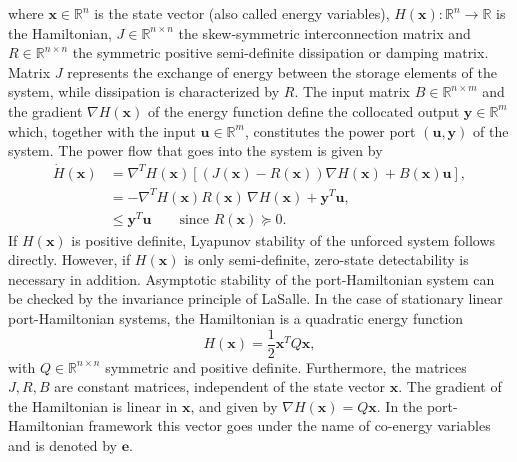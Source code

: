 \documentclass[preprint,12pt]{elsarticle}
\begin{document}
where $\bm{x} \in \mathbb{R}^{n}$ is the state vector (also called  energy variables), $ H(\bm{x}) : \mathbb{R}^{n} \rightarrow \mathbb{R} $ is the Hamiltonian, $J \in \mathbb{R}^{n \times n}$ the skew-symmetric interconnection matrix and $R \in \mathbb{R}^{n \times n}$ the symmetric positive semi-definite dissipation or damping matrix.  Matrix $J$ represents the exchange of energy between the storage elements of the system, while dissipation is characterized by $R$. The
input matrix $B \in \mathbb{R}^{n \times m}$ and the gradient $\nabla H(\bm{x})$ of the energy function define the collocated output $\bm{y} \in \mathbb{R}^{m}$ which, together with the input $\bm{u} \in \mathbb{R}^{m}$, constitutes the power port $(\bm{u}, \bm{y})$ of the system. The power flow that goes into the system is given by
\begin{equation}
\begin{aligned}
\dot{H}(\bm{x}) &= \nabla^T{H(\bm{x})} [(J(\bm{x}) - R(\bm{x})) \nabla H(\bm{x}) + B(\bm{x})\bm{u} ], \\ 
&= - \nabla^T{H(\bm{x})} R(\bm{x}) \, \nabla{H(\bm{x})} + \bm{y}^T \bm{u}, \\
&\le \bm{y}^T \bm{u} \qquad \text{since } R(\bm{x}) \succeq 0.
\end{aligned}
\end{equation}
If $H(\bm{x})$ is positive definite, Lyapunov stability of the unforced system follows directly. However, if $H(\bm{x})$ is only
semi-definite, zero-state detectability is necessary in addition. Asymptotic stability of the port-Hamiltonian system can be checked by the invariance principle of LaSalle. In the case of stationary linear port-Hamiltonian systems, the Hamiltonian is a quadratic energy function
\begin{equation}
H(\bm{x}) =\frac{1}{2} \bm{x}^T Q \bm{x},
\end{equation}
with $Q \in \mathbb{R}^{n \times n}$ symmetric and positive definite. Furthermore, the matrices $J, R, B$ are constant matrices, independent of the state vector $\bm{x}$.  The gradient of the Hamiltonian is  linear in $\bm{x}$, and given by $\nabla H(\bm{x}) = Q \bm{x}$. In the port-Hamiltonian framework this vector goes under the name of co-energy variables and is denoted by $\bm{e}$.
\end{document}
